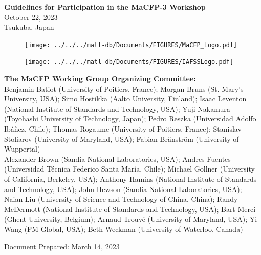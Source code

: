 \documentclass[12pt]{article}
\begin{document}

\thispagestyle{empty}

\begin{center}
{\bf\Large Guidelines for Participation in the MaCFP-3 Workshop} \\
{\large October 22, 2023\\Tsukuba, Japan}
\end{center}

\begin{figure}[h]
  \centering
  \texttt{[image: ../../../matl-db/Documents/FIGURES/MaCFP\_Logo.pdf]}
  \label{Cover_Image}
\end{figure}

\vfill

\begin{minipage}{0.25\textwidth}
\begin{figure}[H]
\texttt{[image: ../../../matl-db/Documents/FIGURES/IAFSSLogo.pdf]}
\end{figure}
\end{minipage} \hfill
\begin{minipage}{0.65\textwidth}
\begin{flushright}
\begin{small}
{\bf The MaCFP Working Group Organizing Committee:} \\
{\footnotesize Benjamin Batiot (University of Poitiers, France); Morgan Bruns (St. Mary's University, USA); Simo Hostikka (Aalto University, Finland); Isaac Leventon (National Institute of Standards and Technology, USA); Yuji Nakamura (Toyohashi University of Technology, Japan); Pedro Reszka (Universidad Adolfo Ibáñez, Chile); Thomas Rogaume (University of Poitiers, France); Stanislav Stoliarov (University of Maryland, USA); Fabian Bränström (University of Wuppertal)}\\
{\footnotesize Alexander Brown (Sandia National Laboratories, USA); Andres Fuentes (Universidad Técnica Federico Santa María, Chile); Michael Gollner (University of California, Berkeley, USA); Anthony Hamins (National Institute of Standards and Technology, USA); John Hewson (Sandia National Laboratories, USA); Naian Liu (University of Science and Technology of China, China); Randy McDermott (National Institute of Standards and Technology, USA); Bart Merci (Ghent University, Belgium); Arnaud Trouvé (University of Maryland, USA); Yi Wang (FM Global, USA); Beth Weckman (University of Waterloo, Canada)}


\end{small}
\end{flushright}
\end{minipage}
\begin{small}
Document Prepared: March 14, 2023\\
\end{small}
\newpage
\thispagestyle{empty}
\tableofcontents
\end{document}
